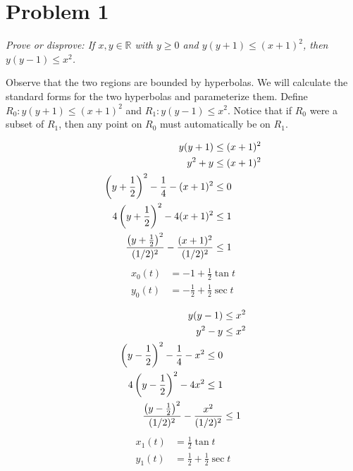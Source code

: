\documentclass{article}
\newcommand*{\paren}[1]{\ensuremath\left(#1\right)}
\newcommand*{\problem}[1]{\section*{Problem #1}}
\begin{document}




\problem{1}

\begin{mdframed}
	\textit{Prove or disprove: If $x,y\in\mathbb{R}$ with $y\geq0$ and $y(y+1)\leq(x+1)^2$, then $y(y-1)\leq x^2$.}
\end{mdframed}

Observe that the two regions are bounded by hyperbolas. We will calculate the standard forms for the two hyperbolas and parameterize them. Define $R_0:y(y+1)\leq(x+1)^2$ and $R_1:y(y-1)\leq x^2$. Notice that if $R_0$ were a subset of $R_1$, then any point on $R_0$ must automatically be on $R_1$.

\begin{multicols}{2}
	\begin{align*}
		y(y+1)&\leq(x+1)^2 \\
		y^2+y&\leq(x+1)^2 \\
		\paren{y+\frac12}^2-\frac14-(x+1)^2&\leq0 \\
		4\paren{y+\frac12}^2-4(x+1)^2&\leq1 \\
		\frac{\paren{y+\frac12}^2}{(1/2)^2}-\frac{(x+1)^2}{(1/2)^2}&\leq1
	\end{align*}
	\begin{align}
		x_0(t)&=-1+\frac12\tan t \\
		y_0(t)&=-\frac{1}{2}+\frac12\sec t
	\end{align}

	\begin{align*}
		y(y-1)&\leq x^2 \\
		y^2-y&\leq x^2 \\
		\paren{y-\frac12}^2-\frac14-x^2\leq0 \\
		4\paren{y-\frac12}^2-4x^2\leq1 \\
		\frac{\paren{y-\frac12}^2}{(1/2)^2}-\frac{x^2}{(1/2)^2}&\leq1
	\end{align*}
	\begin{align}
		x_1(t)&=\frac12\tan t \\
		y_1(t)&=\frac{1}{2}+\frac12\sec t
	\end{align}
\end{multicols}
\end{document}
